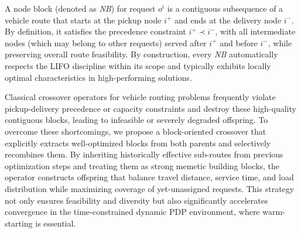 \documentclass[]{interact}
\begin{document}


    
    
    




A node block (denoted as \textit{NB}) for request \(o^i\) is a contiguous subsequence of a vehicle route that starts at the pickup node \(i^+\) and ends at the delivery node \(i^-\). By definition, it satisfies the precedence constraint \(i^+ \prec i^-\), with all intermediate nodes (which may belong to other requests) served after \(i^+\) and before \(i^-\), while preserving overall route feasibility. By construction, every \textit{NB} automatically respects the LIFO discipline within its scope and typically exhibits locally optimal characteristics in high-performing solutions.

Classical crossover operators for vehicle routing problems frequently violate pickup-delivery precedence or capacity constraints and destroy these high-quality contiguous blocks, leading to infeasible or severely degraded offspring. To overcome these shortcomings, we propose a block-oriented crossover that explicitly extracts well-optimized blocks from both parents and selectively recombines them. By inheriting historically effective sub-routes from previous optimization steps and treating them as strong memetic building blocks, the operator constructs offspring that balance travel distance, service time, and load distribution while maximizing coverage of yet-unassigned requests. This strategy not only ensures feasibility and diversity but also significantly accelerates convergence in the time-constrained dynamic PDP environment, where warm-starting is essential. %
\end{document}
